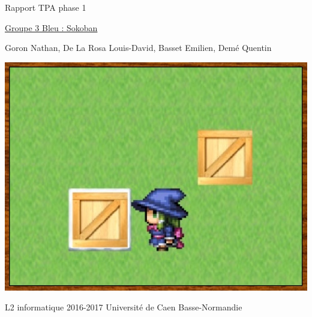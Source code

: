 \documentclass{article}
\begin{document}
\begin{titlepage}
\begin{center}
\Huge Rapport TPA phase 1

\normalsize
\vspace{0.5cm}
\Large {\underline{ Groupe 3 Bleu : Sokoban} }

\vspace{1cm}

\normalsize
Goron Nathan, De La Rosa Louis-David, Basset Emilien, Demé Quentin

\vspace{1cm}
\begin{center}
\includegraphics[scale=0.7]{../Screenshots/main.jpg}
\end{center}
\vspace{3.5cm}
L2 informatique 2016-2017 Université de Caen Basse-Normandie
\end{center}
\end{titlepage}


\newpage



		

\newpage
\end{document}
